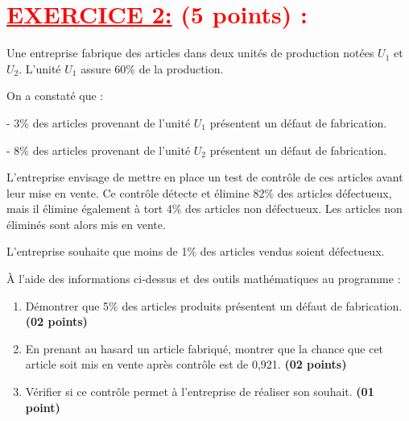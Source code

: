\documentclass[12pt]{article}
\begin{document}
\section*{\textcolor{red}{\underline{EXERCICE 2:} (5 points) :}}

Une entreprise fabrique des articles dans deux unités de production notées \( U_1 \) et \( U_2 \). L’unité \( U_1 \) assure 60\% de la production.

On a constaté que :

- 3\% des articles provenant de l’unité \( U_1 \) présentent un défaut de fabrication.

- 8\% des articles provenant de l’unité \( U_2 \) présentent un défaut de fabrication.

L’entreprise envisage de mettre en place un test de contrôle de ces articles avant leur mise en vente. Ce contrôle détecte et élimine 82\% des articles défectueux, mais il élimine également à tort 4\% des articles non défectueux. Les articles non éliminés sont alors mis en vente.

L’entreprise souhaite que moins de 1\% des articles vendus soient défectueux.

À l’aide des informations ci-dessus et des outils mathématiques au programme :
\begin{enumerate}
    \item Démontrer que 5\% des articles produits présentent un défaut de fabrication. \textbf{(02 points)}
    \item En prenant au hasard un article fabriqué, montrer que la chance que cet article soit mis en vente après contrôle est de 0,921. \textbf{(02 points)}
    \item Vérifier si ce contrôle permet à l’entreprise de réaliser son souhait. \textbf{(01 point)}
\end{enumerate}
\end{document}
